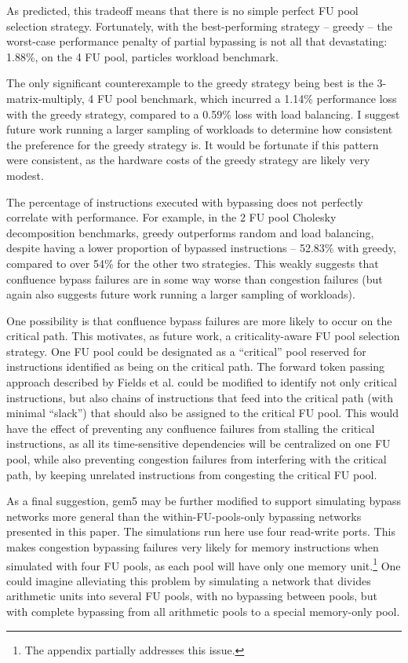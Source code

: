 \documentclass[11pt]{article}
\begin{document}
As predicted, this tradeoff means that there is no simple perfect FU
pool selection strategy. Fortunately, with the best-performing
strategy -- greedy -- the worst-case performance penalty of partial
bypassing is not all that devastating: 1.88\%, on the 4 FU pool,
particles workload benchmark.

The only significant counterexample to the greedy strategy being best
is the 3-matrix-multiply, 4 FU pool benchmark, which incurred a 1.14\%
performance loss with the greedy strategy, compared to a 0.59\% loss
with load balancing. I suggest future work running a larger sampling
of workloads to determine how consistent the preference for the greedy
strategy is. It would be fortunate if this pattern were consistent, as
the hardware costs of the greedy strategy are likely very modest.

The percentage of instructions executed with bypassing does not
perfectly correlate with performance. For example, in the 2 FU pool
Cholesky decomposition benchmarks, greedy outperforms random and load
balancing, despite having a lower proportion of bypassed instructions
-- 52.83\% with greedy, compared to over 54\% for the other two
strategies. This weakly suggests that confluence bypass failures are
in some way worse than congestion failures (but again also suggests
future work running a larger sampling of workloads).

One possibility is that confluence bypass failures are more likely to
occur on the critical path. This motivates, as future work, a
criticality-aware FU pool selection strategy. One FU pool could be
designated as a ``critical'' pool reserved for instructions identified
as being on the critical path. The forward token passing approach
described by Fields et al. could be modified to identify not only
critical instructions, but also chains of instructions that feed into
the critical path (with minimal ``slack'') that should also be
assigned to the critical FU pool. This would have the effect of
preventing any confluence failures from stalling the critical
instructions, as all its time-sensitive dependencies will be
centralized on one FU pool, while also preventing congestion failures
from interfering with the critical path, by keeping unrelated
instructions from congesting the critical FU pool.

As a final suggestion, gem5 may be further modified to support
simulating bypass networks more general than the within-FU-pools-only
bypassing networks presented in this paper. The simulations run here
use four read-write ports. This makes congestion bypassing failures
very likely for memory instructions when simulated with four FU pools,
as each pool will have only one memory unit.\footnote{The appendix
  partially addresses this issue.} One could imagine alleviating this
problem by simulating a network that divides arithmetic units into
several FU pools, with no bypassing between pools, but with complete
bypassing from all arithmetic pools to a special memory-only pool.
\end{document}
